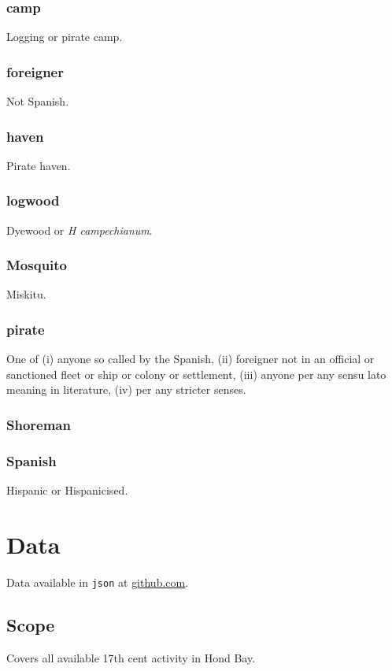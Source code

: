 \documentclass{amsart}
\newcommand{\code}[1]{\texttt{#1}}%
\newcommand{\foreign}[1]{\textit{#1}}%
\theoremstyle{definition}%
\theoremstyle{definition}%
\theoremstyle{remark}%
\begin{document}
\subsubsection{camp} Logging or pirate camp.%
%
\subsubsection{foreigner} Not Spanish.%
%
\subsubsection{haven} Pirate haven.%
%
\subsubsection{logwood} Dyewood or \foreign{H campechianum}.
%
\subsubsection{Mosquito} Miskitu.
%
\subsubsection{pirate}\label{term:pir} One of (i) anyone so called by the Spanish, (ii) foreigner not in an official or sanctioned fleet or ship or colony or settlement, (iii) anyone per any sensu lato meaning in literature, (iv) per any stricter senses.
%
\subsubsection{Shoreman}
%
\subsubsection{Spanish} Hispanic or Hispanicised.
%
%
%
%
\section{Data}
\label{s:data}
\lipsum[2][1-4]
Data available in \code{json} at \href{http://github.com/aenavidad/pp-0}{github.com}.
\subsection{Scope} Covers all available 17th cent activity in Hond Bay.
\end{document}
